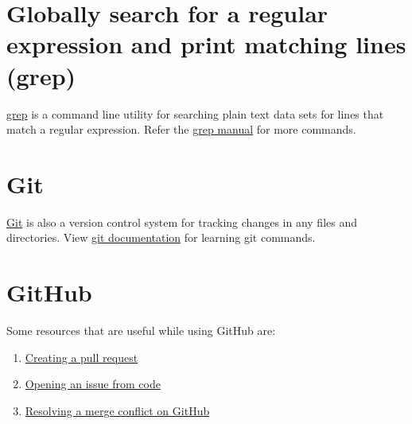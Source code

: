 \documentclass[
]{book}
\begin{document}
\section{Globally search for a regular expression and print matching lines (grep)}\label{globally-search-for-a-regular-expression-and-print-matching-lines-grep}

\href{https://en.wikipedia.org/wiki/Grep}{grep} is a command line utility for searching plain text data sets for lines that match a regular expression. Refer the \href{https://www.gnu.org/software/grep/manual/grep.html}{grep manual} for more commands.

\section{Git}\label{git}

\href{https://en.wikipedia.org/wiki/Git}{Git} is also a version control system for tracking changes in any files and directories. View \href{https://git-scm.com/doc}{git documentation} for learning git commands.

\section{GitHub}\label{github}

Some resources that are useful while using GitHub are:

\begin{enumerate}
\def\labelenumi{\arabic{enumi}.}
\item
  \href{https://docs.github.com/en/github/collaborating-with-issues-and-pull-requests/creating-a-pull-request}{Creating a pull request}
\item
  \href{https://docs.github.com/en/github/managing-your-work-on-github/opening-an-issue-from-code}{Opening an issue from code}
\item
  \href{https://docs.github.com/en/github/collaborating-with-issues-and-pull-requests/resolving-a-merge-conflict-on-github}{Resolving a merge conflict on GitHub}
\end{enumerate}

  
\end{document}
